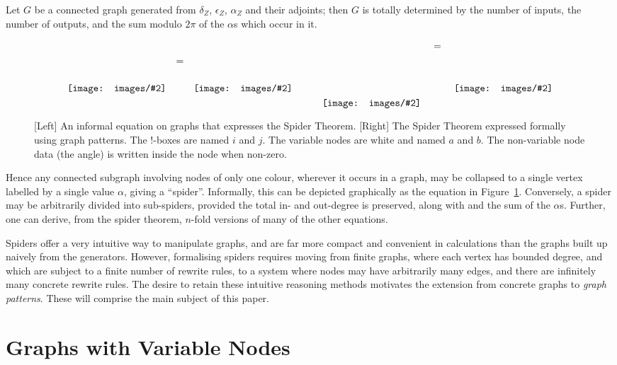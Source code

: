 \documentclass[runningheads]{llncs}
\newcommand{\inlinegraphic}[2]{
  \dimendef\grafheight=255\dimendef\grafvshift=254
  \grafheight=#1
  \grafvshift=-0.5\grafheight
  \advance\grafvshift by 0.5ex
  \raisebox{\grafvshift}{\texttt{[image: images/\#2]}\xspace}
}
\begin{document}
\begin{theorem}
  Let $G$ be a connected graph generated
  from $\delta_Z$, $\epsilon_Z$, $\alpha_Z$ and their adjoints; then
  $G$ is totally determined by the number of inputs, the number of
  outputs, and the sum modulo $2\pi$ of the $\alpha$s which occur in
  it.
\end{theorem}

\begin{figure}[t]
$$\begin{array}{ccc}
\inlinegraphic{6em}{spider_lhs} & = & \inlinegraphic{6em}{spider_rhs}
\end{array}\qquad
\begin{array}{ccc}
\inlinegraphic{12em}{spider_lhs_patt} & \;=\; & \inlinegraphic{9em}{spider_rhs_patt}
\end{array}$$
\label{fig:spider}\caption{ [Left] An informal equation on graphs that
  expresses the Spider Theorem.  [Right] The Spider Theorem expressed
  formally using graph patterns.  The !-boxes are named $i$ and $j$.
  The variable nodes are white and named $a$ and $b$. The non-variable
  node data (the angle) is written inside the node when non-zero.}

\end{figure}

Hence any connected subgraph involving nodes of only one colour,
wherever it occurs in a graph, may be collapsed to a single vertex
labelled by a single value $\alpha$, giving a ``spider''. Informally,
this can be depicted graphically as the equation in
Figure~\ref{fig:spider}. Conversely, a spider may be
arbitrarily divided into sub-spiders, provided the total in- and
out-degree is preserved, along with and the sum of the $\alpha $s.
Further, one can derive, from the spider theorem, $n$-fold versions of
many of the other equations.

Spiders offer a very intuitive way to manipulate graphs, and are far
more compact and convenient in calculations than the graphs built up
naively from the generators.  However, formalising spiders requires
moving from finite graphs, where each vertex has bounded degree, and
which are subject to a finite number of rewrite rules, to a system
where nodes may have arbitrarily many edges, and there are infinitely
many concrete rewrite rules. The desire to retain these intuitive
reasoning methods motivates the extension from concrete graphs to
\emph{graph patterns}. These will comprise the main subject of this
paper.

\section{Graphs with Variable Nodes}
\end{document}
